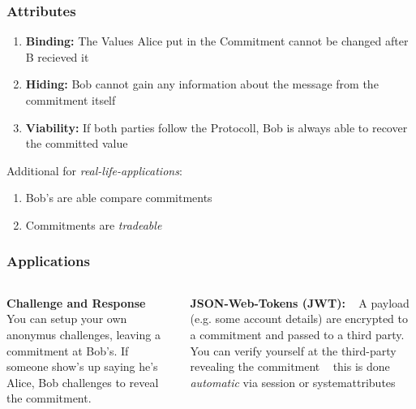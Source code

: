 \begin{frame}
	\frametitle{Attributes}
	\begin{enumerate}
		\item \textbf{Binding:} The Values Alice put in the Commitment cannot be changed after B recieved it 
		\item \textbf{Hiding:} Bob cannot gain any information about the message from the commitment itself
		\item \textbf{Viability:} If both parties follow the Protocoll, Bob is always able to recover the committed value
	\end{enumerate}
	Additional for \textit{real-life-applications}:
	\begin{enumerate}
		\item Bob's are able compare commitments
		\item Commitments are \textit{tradeable}
	\end{enumerate}
\end{frame}

\begin{frame}
	\frametitle{Applications}
	\begin{columns}
		\begin{column}{0.5\textwidth}
			\textbf{Challenge and Response} ~\newline
			You can setup your own anonymus challenges, leaving a commitment at Bob's. If someone show's up saying he's Alice, Bob challenges to reveal the commitment.
		\end{column}
		\begin{column}{0.5\textwidth}
			\textbf{JSON-Web-Tokens (JWT):} ~\newline
			A payload (e.g. some account details) are encrypted to a commitment and passed to a third party. ~\newline 
			You can verify yourself at the third-party revealing the commitment ~\newline 
			this is done \textit{automatic} via session or systemattributes 
		\end{column}
	\end{columns}
\end{frame}